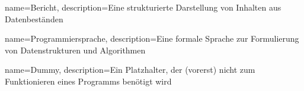 
{
    name=Bericht,
    description={Eine strukturierte Darstellung von Inhalten aus Datenbeständen}
}

{
    name=Programmiersprache,
    description={Eine formale Sprache zur Formulierung von Datenstrukturen und Algorithmen}
}

{
    name=Dummy,
    description={Ein Platzhalter, der (vorerst) nicht zum Funktionieren eines Programms benötigt wird}
}